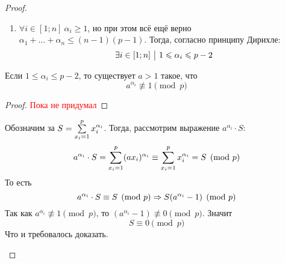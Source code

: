\begin{proof}
\begin{enumerate}
\begin{enumerate}
			\item $\forall i \in [1; n]\ \alpha_i \ge 1$, но при этом всё ещё верно $\alpha_1 + \ldots + \alpha_n \le (n - 1)(p - 1)$. Тогда, согласно принципу Дирихле:
			\[
				\exists i \in [1; n] \ \big|\  1 \leqslant \alpha_i \leqslant p - 2
			\]
		\end{enumerate}
		\begin{proposition}
			Если $1 \le \alpha_i \le p - 2$, то существует $a > 1$ такое, что
			\[
				a^{\alpha_i} \not\equiv 1 \pmod p
			\]
		\end{proposition}
		\begin{proof}
			\textcolor{red}{Пока не придумал}
		\end{proof}
		
		Обозначим за $S = \sum\limits_{x_i = 1}^p x_i^{\alpha_i}$. Тогда, рассмотрим выражение $a^{\alpha_i} \cdot S$:
		\[
			a^{\alpha_i} \cdot S = \sum\limits_{x_i = 1}^p (ax_i)^{\alpha_i} \equiv \sum\limits_{x_i = 1}^p x_i^{\alpha_i} = S \pmod p
		\]
		То есть
		\[
			a^{\alpha_i} \cdot S \equiv S \pmod p \Rightarrow S(a^{\alpha_i} - 1) \pmod p
		\]
		Так как $a^{\alpha_i} \not\equiv 1 \pmod p$, то $(a^{\alpha_i} - 1) \not\equiv 0 \pmod p$. Значит
		\[
			S \equiv 0 \pmod p
		\]
		Что и требовалось доказать.
	\end{enumerate}
\end{proof}